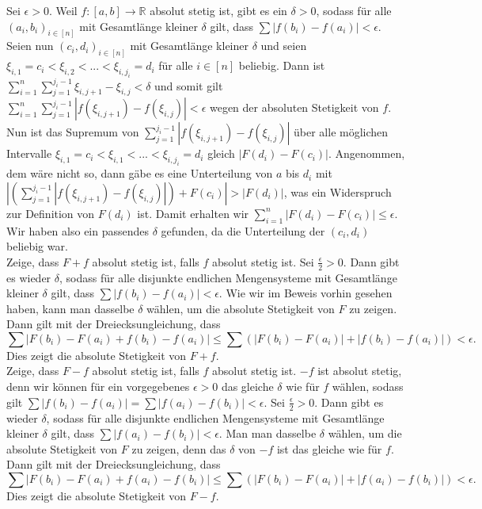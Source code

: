 \documentclass[a4paper]{article}
\theoremstyle{plain}
\begin{document}
Sei $\epsilon > 0$. Weil $f: [a,b] \to \mathbb R$ absolut stetig ist, gibt es ein $\delta > 0$, sodass für alle $(a_i,b_i)_{i \in [n]}$ mit Gesamtlänge kleiner $\delta$ gilt, dass $\sum |f(b_i)-f(a_i)| < \epsilon$. Seien nun $(c_i,d_i)_{i \in [n]}$ mit Gesamtlänge kleiner $\delta$ und seien $\xi_{i,1} = c_i < \xi_{i,2} < ... < \xi_{i,j_i} = d_i$ für alle $i \in [n]$ beliebig. Dann ist $\sum_{i=1}^n\sum_{j=1}^{j_i-1} \xi_{i,j+1} - \xi_{i,j} < \delta$ und somit gilt $\sum_{i=1}^n\sum_{j=1}^{j_i-1} |f(\xi_{i,j+1})-f(\xi_{i,j})| < \epsilon$ wegen der absoluten Stetigkeit von $f$. Nun ist das Supremum von $\sum_{j=1}^{j_i-1} |f(\xi_{i,j+1})-f(\xi_{i,j})|$ über alle möglichen Intervalle  $\xi_{i,1} = c_i < \xi_{i,1} < ... < \xi_{i,j_i} = d_i$ gleich $|F(d_i) - F(c_i)|$. Angenommen, dem wäre nicht so, dann gäbe es eine Unterteilung von $a$ bis $d_i$ mit $|(\sum_{j=1}^{j_i-1} |f(\xi_{i,j+1})-f(\xi_{i,j})|) + F(c_i) | > |F(d_i)|$, was ein Widerspruch zur Definition von $F(d_i)$ ist. Damit erhalten wir $\sum^n_{i=1} |F(d_i) - F(c_i)| \leq \epsilon$. Wir haben also ein passendes $\delta$ gefunden, da die Unterteilung der $(c_i,d_i)$ beliebig war.\\

Zeige, dass $F+f$ absolut stetig ist, falls $f$ absolut stetig ist. Sei $\frac{\epsilon}{2} >0$. Dann gibt es wieder $\delta$, sodass für alle disjunkte endlichen Mengensysteme mit Gesamtlänge kleiner $\delta$ gilt, dass $\sum |f(b_i) - f(a_i)| < \epsilon$. Wie wir im Beweis vorhin gesehen haben, kann man dasselbe $\delta$ wählen, um die absolute Stetigkeit von $F$ zu zeigen. Dann gilt mit der Dreiecksungleichung, dass $$\sum |F(b_i) - F(a_i) + f(b_i) - f(a_i)| \leq \sum (|F(b_i) - F(a_i)| + |f(b_i) - f(a_i)|) < \epsilon.$$
Dies zeigt die absolute Stetigkeit von $F+f$.\\

Zeige, dass $F-f$ absolut stetig ist, falls $f$ absolut stetig ist. $-f$ ist absolut stetig, denn wir können für ein vorgegebenes $\epsilon >0$ das gleiche $\delta$ wie für $f$ wählen, sodass gilt $\sum |f(b_i) - f(a_i)| = \sum |f(a_i) - f(b_i)| < \epsilon$. Sei $\frac{\epsilon}{2} >0$. Dann gibt es wieder $\delta$, sodass für alle disjunkte endlichen Mengensysteme mit Gesamtlänge kleiner $\delta$ gilt, dass $\sum |f(a_i) - f(b_i)| < \epsilon$. Man man dasselbe $\delta$ wählen, um die absolute Stetigkeit von $F$ zu zeigen, denn das $\delta$ von $-f$ ist das gleiche wie für $f$. Dann gilt mit der Dreiecksungleichung, dass $$\sum |F(b_i) - F(a_i) + f(a_i) - f(b_i)| \leq \sum (|F(b_i) - F(a_i)| + |f(a_i) - f(b_i)|) < \epsilon.$$
Dies zeigt die absolute Stetigkeit von $F-f$.
\end{document}
